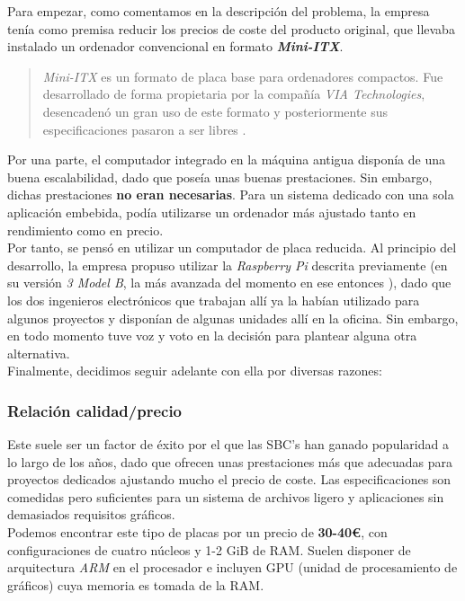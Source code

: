 Para empezar, como comentamos en la descripción del problema, la empresa tenía como premisa reducir los precios de coste del producto original, que llevaba instalado un ordenador convencional en formato \textbf{\textit{Mini-ITX}}.

\begin{quotation}
	\textit{Mini-ITX} es un formato de placa base para ordenadores compactos. Fue desarrollado de forma propietaria por la compañía \textit{VIA Technologies}, desencadenó un gran uso de este formato y posteriormente sus especificaciones pasaron a ser libres \cite{via-mini-itx}.
\end{quotation}

Por una parte, el computador integrado en la máquina antigua disponía de una buena escalabilidad, dado que poseía unas buenas prestaciones. Sin embargo, dichas prestaciones \textbf{no eran necesarias}. Para un sistema dedicado con una sola aplicación embebida, podía utilizarse un ordenador más ajustado tanto en rendimiento como en precio.\\

Por tanto, se pensó en utilizar un computador de placa reducida. Al principio del desarrollo, la empresa propuso utilizar la \textit{Raspberry Pi} descrita previamente (en su versión \textit{3 Model B}, la más avanzada del momento en ese entonces \cite{raspberry-pi-3-model-b}), dado que los dos ingenieros electrónicos que trabajan allí ya la habían utilizado para algunos proyectos y disponían de algunas unidades allí en la oficina. Sin embargo, en todo momento tuve voz y voto en la decisión para plantear alguna otra alternativa.\\

Finalmente, decidimos seguir adelante con ella por diversas razones:

\subsubsection{Relación calidad/precio}

Este suele ser un factor de éxito por el que las SBC's han ganado popularidad a lo largo de los años, dado que ofrecen unas prestaciones más que adecuadas para proyectos dedicados ajustando mucho el precio de coste. Las especificaciones son comedidas pero suficientes para un sistema de archivos ligero y aplicaciones sin demasiados requisitos gráficos.\\

Podemos encontrar este tipo de placas por un precio de \textbf{30-40€}, con configuraciones de cuatro núcleos y 1-2 GiB de RAM. Suelen disponer de arquitectura \textit{ARM} en el procesador e incluyen GPU (unidad de procesamiento de gráficos) cuya memoria es tomada de la RAM.\\

